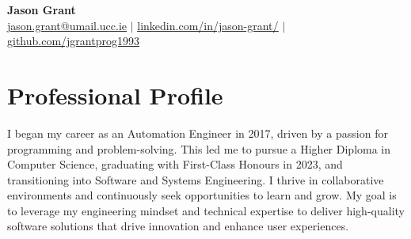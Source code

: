 \documentclass[letterpaper,11pt]{article}
\begin{document}

\begin{center}
    \textbf{\Huge  Jason Grant} \\ \vspace{1pt}
    \href{mailto:jason.grant@umail.ucc.ie}
    {\underline{jason.grant@umail.ucc.ie}} $|$ 
    \href{https://linkedin.com/in/jason-grant/}{\underline{linkedin.com/in/jason-grant/}} $|$
    \href{https://github.com/jgrantprog1993}{\underline{github.com/jgrantprog1993}}
\end{center}

\section{Professional Profile}
 \begin{itemize}[leftmargin=0.15in, label={}]
    \small{\item{
     {I began my career as an Automation Engineer in 2017, driven by a passion for programming and problem-solving. This led me to pursue a Higher Diploma in Computer Science, graduating with First-Class Honours in 2023, and transitioning into Software and Systems Engineering. I thrive in collaborative environments and continuously seek opportunities to learn and grow. My goal is to leverage my engineering mindset and technical expertise to deliver high-quality software solutions that drive innovation and enhance user experiences.} \\
    }}
 \end{itemize}
 
\end{document}
